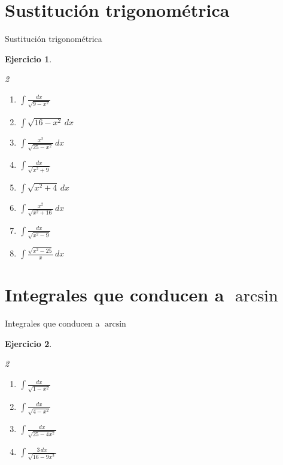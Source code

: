 \documentclass[10pt,aspectratio=169]{beamer}
\newtheorem{Ejer}{Ejercicio}
\begin{document}
\section{Sustitución trigonométrica}
\begin{frame}{Sustitución trigonométrica}
\begin{Ejer}
\begin{multicols}{2}
\begin{enumerate}
\item $\displaystyle \int \frac{dx}{\sqrt{9-x^2}}$
\item $\displaystyle \int \sqrt{16-x^2}\,dx$
\item $\displaystyle \int \frac{x^2}{\sqrt{25-x^2}}\,dx$
\item $\displaystyle \int \frac{dx}{\sqrt{x^2+9}}$
\item $\displaystyle \int \sqrt{x^2+4}\,dx$
\item $\displaystyle \int \frac{x^2}{\sqrt{x^2+16}}\,dx$
\item $\displaystyle \int \frac{dx}{\sqrt{x^2-9}}$
\item $\displaystyle \int \frac{\sqrt{x^2-25}}{x}\,dx$
\end{enumerate}
\end{multicols}
\end{Ejer}
\end{frame}

\section{Integrales que conducen a $\arcsin$}
\begin{frame}{Integrales que conducen a $\arcsin$}
\begin{Ejer}
\begin{multicols}{2}
\begin{enumerate}
\item $\displaystyle \int \frac{dx}{\sqrt{1-x^2}}$
\item $\displaystyle \int \frac{dx}{\sqrt{4-x^2}}$
\item $\displaystyle \int \frac{dx}{\sqrt{25-4x^2}}$
\item $\displaystyle \int \frac{3\,dx}{\sqrt{16-9x^2}}$
\end{enumerate}
\end{multicols}
\end{Ejer}
\end{frame}
\end{document}

